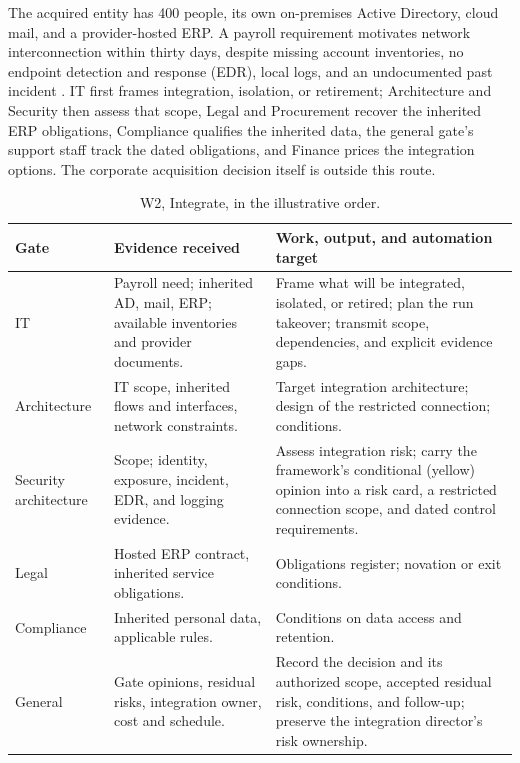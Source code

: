 The acquired entity has 400 people, its own on-premises Active Directory, cloud mail, and a
provider-hosted ERP. A payroll requirement motivates network interconnection within thirty days,
despite missing account inventories, no endpoint detection and response (EDR), local logs, and an
undocumented past incident \citep[p.~104]{canale2026}. IT first frames integration, isolation, or
retirement; Architecture and Security then assess that scope, Legal and Procurement recover the
inherited ERP obligations, Compliance qualifies the inherited data, the general gate's support staff
track the dated obligations, and Finance prices the integration options. The corporate acquisition
decision itself is outside this route.

\begin{table}[!htb]
\centering\small
\caption{W2, Integrate, in the illustrative order.}
\label{tab:w2}
\begin{tabularx}{\linewidth}{@{}P{2.7cm}LL@{}}
\toprule
Gate & Evidence received & Work, output, and automation target\\
\midrule
IT & Payroll need; inherited AD, mail, ERP; available inventories and provider documents. & Frame what
will be integrated, isolated, or retired; plan the run takeover; transmit scope, dependencies, and
explicit evidence gaps.\\
Architecture & IT scope, inherited flows and interfaces, network constraints. & Target integration
architecture; design of the restricted connection; conditions.\\
Security architecture & Scope; identity, exposure, incident, EDR, and logging evidence. & Assess
integration risk; carry the framework's conditional (yellow) opinion into a risk card, a restricted
connection scope, and dated control requirements.\\
Legal & Hosted ERP contract, inherited service obligations. & Obligations register; novation or exit
conditions.\\
Compliance & Inherited personal data, applicable rules. & Conditions on data access and retention.\\
General & Gate opinions, residual risks, integration owner, cost and schedule. & Record the decision and
its authorized scope, accepted residual risk, conditions, and follow-up; preserve the integration
director's risk ownership.\\
\bottomrule
\end{tabularx}
\end{table}

